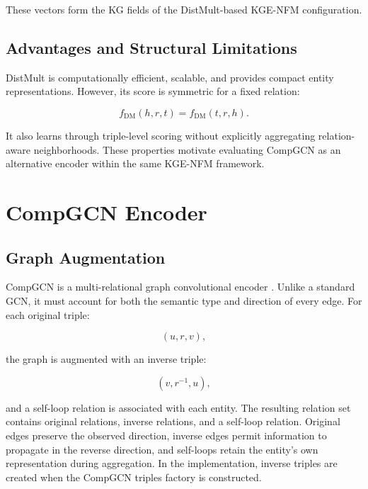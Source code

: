 These vectors form the KG fields of the DistMult-based KGE-NFM configuration.

\subsection{Advantages and Structural Limitations}

DistMult is computationally efficient, scalable, and provides compact entity
representations. However, its score is symmetric for a fixed relation:

\begin{equation}
    f_{\mathrm{DM}}(h,r,t)
    =
    f_{\mathrm{DM}}(t,r,h).
\end{equation}

It also learns through triple-level scoring without explicitly aggregating
relation-aware neighborhoods. These properties motivate evaluating CompGCN as
an alternative encoder within the same KGE-NFM framework.

\section{CompGCN Encoder}

\subsection{Graph Augmentation}

CompGCN is a multi-relational graph convolutional encoder
\cite{vashishth2020composition}. Unlike a standard GCN, it must account for
both the semantic type and direction of every edge. For each original triple:

\begin{equation}
    (u,r,v),
\end{equation}

the graph is augmented with an inverse triple:

\begin{equation}
    (v,r^{-1},u),
\end{equation}

and a self-loop relation is associated with each entity. The resulting
relation set contains original relations, inverse relations, and a self-loop
relation. Original edges preserve the observed direction, inverse edges permit
information to propagate in the reverse direction, and self-loops retain the
entity's own representation during aggregation. In the implementation,
inverse triples are created when the CompGCN triples factory is constructed.

